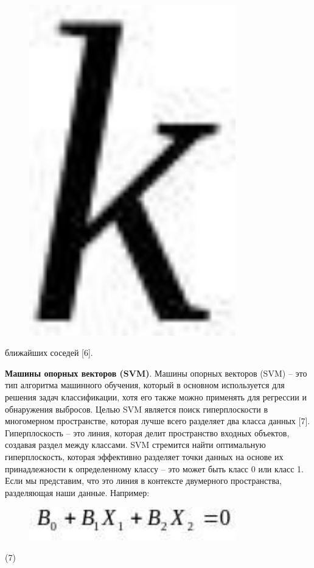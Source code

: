 \begin{figure}[H]
	\centering
	\includegraphics[width=0.8\textwidth]{assets/92}
	\caption*{}
\end{figure} ближайших соседей {[}6{]}.

{\bfseries Машины опорных векторов (SVM)}. Машины опорных векторов (SVM) --
это тип алгоритма машинного обучения, который в основном используется
для решения задач классификации, хотя его также можно применять для
регрессии и обнаружения выбросов. Целью SVM является поиск
гиперплоскости в многомерном пространстве, которая лучше всего разделяет
два класса данных {[}7{]}. Гиперплоскость -- это линия, которая делит
пространство входных объектов, создавая раздел между классами. SVM
стремится найти оптимальную гиперплоскость, которая эффективно разделяет
точки данных на основе их принадлежности к определенному классу -- это
может быть класс 0 или класс 1. Если мы представим, что это линия в
контексте двумерного пространства, разделяющая наши данные. Например:

\begin{figure}[H]
	\centering
	\includegraphics[width=0.8\textwidth]{assets/104}
	\caption*{}
\end{figure} (7)

